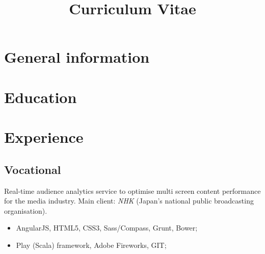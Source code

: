 \documentclass[11pt,a4paper]{moderncv-mod}
\title{Curriculum Vitae}               %
\begin{document}
\maketitle

\section{General information}

\section{Education}
\newline



\section{Experience}
\subsection{Vocational}

{Real-time audience analytics service to optimise multi screen content performance for the media industry. Main client: \emph{NHK} (Japan's national public broadcasting organisation).
\begin{itemize}%
\item AngularJS, HTML5, CSS3, Sass/Compass, Grunt, Bower;
\item Play (Scala) framework, Adobe Fireworks, GIT;
\end{itemize}%
}
\end{document}
